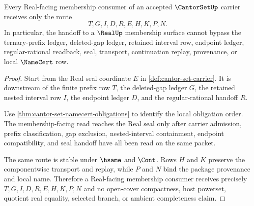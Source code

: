 \begin{theorem}
\label{thm:cantor-set-real-membership-handoff}
Every Real-facing membership consumer of an accepted $\CantorSetUp$ carrier receives only the route
$$
T,G,I,D,R,E,H,K,P,N .
$$
In particular, the handoff to a $\RealUp$ membership surface cannot bypass the ternary-prefix ledger, deleted-gap ledger, retained interval row, endpoint ledger, regular-rational readback, seal, transport, continuation replay, provenance, or local $\NameCert$ row.
\end{theorem}
\begin{proof}
Start from the Real seal coordinate $E$ in \autoref{def:cantor-set-carrier}. It is downstream of the finite prefix row $T$, the deleted-gap ledger $G$, the retained nested interval row $I$, the endpoint ledger $D$, and the regular-rational handoff $R$.

Use \autoref{thm:cantor-set-namecert-obligations} to identify the local obligation order. The membership-facing read reaches the Real seal only after carrier admission, prefix classification, gap exclusion, nested-interval containment, endpoint compatibility, and seal handoff have all been read on the same packet.

The same route is stable under $\hsame$ and $\Cont$. Rows $H$ and $K$ preserve the componentwise transport and replay, while $P$ and $N$ bind the package provenance and local name. Therefore a Real-facing membership consumer receives precisely $T,G,I,D,R,E,H,K,P,N$ and no open-cover compactness, host powerset, quotient real equality, selected branch, or ambient completeness claim.
\end{proof}

